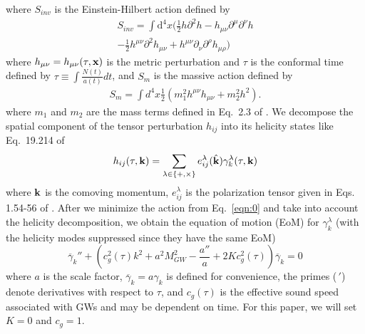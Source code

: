 \documentclass[prd,twocolumn,aps,psfig,nofootinbib,nobibnotes,superscriptaddress,preprintnumbers,times]{revtex4-2}
\begin{document}
where $S_{inv}$ is the Einstein-Hilbert action defined by 
\begin{equation} \label{eqn:1}
     \begin{multlined}
     S_{inv} = \int \text{d}^4x\Bigg(\frac{1}{2}h\partial^2h - h_{\mu \nu}\partial^\mu \partial^\nu h \\ - \frac{1}{2}h^{\mu\nu} \partial^2 h_{\mu\nu} + h^{\mu\nu}\partial_\nu \partial^\rho h_{\mu \rho} \Bigg) 
    \end{multlined}
\end{equation} 
where $h_{\mu\nu} = h_{\mu\nu}(\tau,{\bf x})$ is the metric perturbation and $\tau$ is the conformal time defined by $\tau \equiv \int \frac{N(t)}{a(t)}dt$, and $S_m$ is the massive action defined by 
\begin{equation} \label{eqn:2}
     \begin{multlined}
     S_m = \int d^4x\frac{1}{2}(m_1^2 h^{\mu\nu}h_{\mu\nu}+ m_2^2 h^2).
    \end{multlined}
\end{equation}
where $m_1$ and $m_2$ are the mass terms defined in Eq.\ 2.3 of \cite{Blasi:2017}. 
We decompose the spatial component of the tensor perturbation $h_{ij}$ into its helicity states like Eq.\ 19.214 of \cite{Maggiore:v2} 
\begin{equation}\label{eqn:3}
    h_{ij}(\tau, {\bf k}) = \sum_{\lambda \in \{+, \times\}}e^\lambda_{ij}(\hat{\bf k})\gamma_k^\lambda(\tau, {\bf k})
\end{equation}
where ${\bf k}$ is the comoving momentum, $e^\lambda_{ij}$ is the polarization tensor given in Eqs. 1.54-56 of \cite{Maggiore:v1}. 
After we minimize the action from Eq.\ \ref{eqn:0} and take into account the helicity decomposition, we obtain the equation of motion (EoM) for $\gamma_{k}^\lambda$ (with the helicity modes suppressed since they have the same EoM)
\begin{equation}\label{eqn:4}
    \overline{\gamma}_k'' + \left(c_g^2(\tau) k^2 + a^2 M_{GW}^2 - \frac{a''}{a} + 2Kc_g^2(\tau)\right)\overline{\gamma}_k = 0
\end{equation}
where $a$ is the scale factor, $\overline{\gamma}_k = a\gamma_k$ is defined for convenience, the primes ($\,'$) denote derivatives with respect to $\tau$, and $c_g(\tau)$ is the effective sound speed associated with GWs and may be dependent on time. For this paper, we will set $K = 0$ and $c_g = 1$. 
\end{document}
